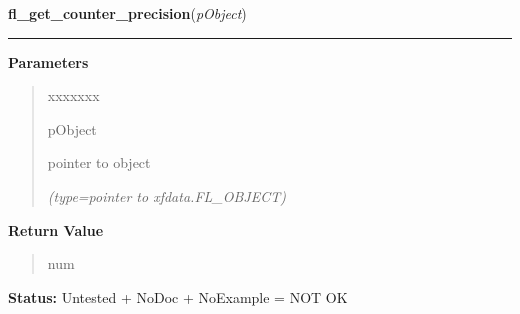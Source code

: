 \hspace{.8\funcindent}\begin{boxedminipage}{\funcwidth}

    \raggedright \textbf{fl\_get\_counter\_precision}(\textit{pObject})

    \vspace{-1.5ex}

    \rule{\textwidth}{0.5\fboxrule}
\setlength{\parskip}{2ex}
\setlength{\parskip}{1ex}
      \textbf{Parameters}
      \vspace{-1ex}

      \begin{quote}
        \begin{Ventry}{xxxxxxx}

          \item[pObject]

          pointer to object

            {\it (type=pointer to xfdata.FL\_OBJECT)}

        \end{Ventry}

      \end{quote}

      \textbf{Return Value}
    \vspace{-1ex}

      \begin{quote}
      num

      \end{quote}

\textbf{Status:} Untested + NoDoc + NoExample = NOT OK



    \end{boxedminipage}

    \label{xformslib:library:fl_get_counter_value}

    \vspace{0.5ex}

